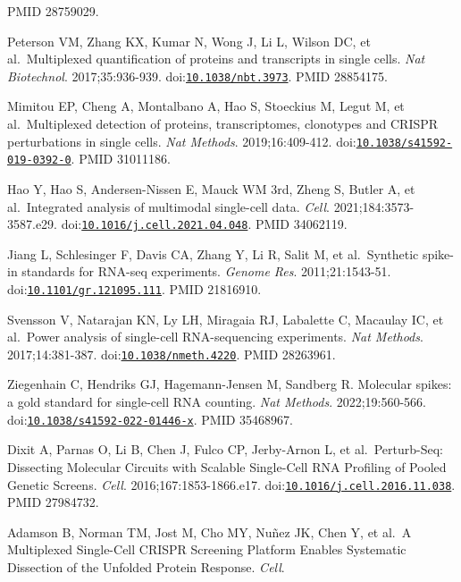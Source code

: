 \documentclass[11pt]{article}
\begin{document}
\begin{enumerate}[label={[\arabic*]},leftmargin=2.6em,labelsep=0.5em,itemsep=1.5pt]
  PMID 28759029.
\item
  Peterson VM, Zhang KX, Kumar N, Wong J, Li L, Wilson DC, et
  al.~Multiplexed quantification of proteins and transcripts in single
  cells. \emph{Nat Biotechnol}. 2017;35:936-939.
  doi:\href{https://doi.org/10.1038/nbt.3973}{\nolinkurl{10.1038/nbt.3973}}. PMID
  28854175.
\item
  Mimitou EP, Cheng A, Montalbano A, Hao S, Stoeckius M, Legut M, et
  al.~Multiplexed detection of proteins, transcriptomes, clonotypes and
  CRISPR perturbations in single cells. \emph{Nat Methods}.
  2019;16:409-412.
  doi:\href{https://doi.org/10.1038/s41592-019-0392-0}{\nolinkurl{10.1038/s41592-019-0392-0}}.
  PMID 31011186.
\item
  Hao Y, Hao S, Andersen-Nissen E, Mauck WM 3rd, Zheng S, Butler A, et
  al.~Integrated analysis of multimodal single-cell data. \emph{Cell}.
  2021;184:3573-3587.e29.
  doi:\href{https://doi.org/10.1016/j.cell.2021.04.048}{\nolinkurl{10.1016/j.cell.2021.04.048}}.
  PMID 34062119.
\item
  Jiang L, Schlesinger F, Davis CA, Zhang Y, Li R, Salit M, et
  al.~Synthetic spike-in standards for RNA-seq experiments. \emph{Genome
  Res}. 2011;21:1543-51.
  doi:\href{https://doi.org/10.1101/gr.121095.111}{\nolinkurl{10.1101/gr.121095.111}}.
  PMID 21816910.
\item
  Svensson V, Natarajan KN, Ly LH, Miragaia RJ, Labalette C, Macaulay
  IC, et al.~Power analysis of single-cell RNA-sequencing experiments.
  \emph{Nat Methods}. 2017;14:381-387.
  doi:\href{https://doi.org/10.1038/nmeth.4220}{\nolinkurl{10.1038/nmeth.4220}}.
  PMID 28263961.
\item
  Ziegenhain C, Hendriks GJ, Hagemann-Jensen M, Sandberg R. Molecular
  spikes: a gold standard for single-cell RNA counting. \emph{Nat
  Methods}. 2022;19:560-566.
  doi:\href{https://doi.org/10.1038/s41592-022-01446-x}{\nolinkurl{10.1038/s41592-022-01446-x}}.
  PMID 35468967.
\item
  Dixit A, Parnas O, Li B, Chen J, Fulco CP, Jerby-Arnon L, et
  al.~Perturb-Seq: Dissecting Molecular Circuits with Scalable
  Single-Cell RNA Profiling of Pooled Genetic Screens. \emph{Cell}.
  2016;167:1853-1866.e17.
  doi:\href{https://doi.org/10.1016/j.cell.2016.11.038}{\nolinkurl{10.1016/j.cell.2016.11.038}}.
  PMID 27984732.
\item
  Adamson B, Norman TM, Jost M, Cho MY, Nuñez JK, Chen Y, et al.~A
  Multiplexed Single-Cell CRISPR Screening Platform Enables Systematic
  Dissection of the Unfolded Protein Response. \emph{Cell}.

\end{enumerate}
\end{document}
